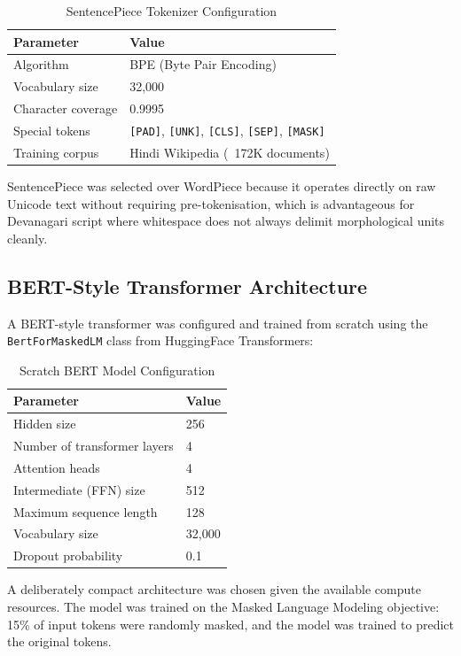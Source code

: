 \documentclass[12pt,a4paper]{report}
\begin{document}
\begin{table}[H]
\centering
\caption{SentencePiece Tokenizer Configuration}
\begin{tabular}{|l|l|}
\hline
\textbf{Parameter} & \textbf{Value} \\
\hline
Algorithm & BPE (Byte Pair Encoding) \\
Vocabulary size & 32,000 \\
Character coverage & 0.9995 \\
Special tokens & \texttt{[PAD]}, \texttt{[UNK]}, \texttt{[CLS]}, \texttt{[SEP]}, \texttt{[MASK]} \\
Training corpus & Hindi Wikipedia (~172K documents) \\
\hline
\end{tabular}
\end{table}

SentencePiece was selected over WordPiece because it operates directly on raw Unicode text without requiring pre-tokenisation, which is advantageous for Devanagari script where whitespace does not always delimit morphological units cleanly.

\subsection{BERT-Style Transformer Architecture}

A BERT-style transformer was configured and trained from scratch using the \texttt{BertForMaskedLM} class from HuggingFace Transformers:

\begin{table}[H]
\centering
\caption{Scratch BERT Model Configuration}
\begin{tabular}{|l|l|}
\hline
\textbf{Parameter} & \textbf{Value} \\
\hline
Hidden size & 256 \\
Number of transformer layers & 4 \\
Attention heads & 4 \\
Intermediate (FFN) size & 512 \\
Maximum sequence length & 128 \\
Vocabulary size & 32,000 \\
Dropout probability & 0.1 \\
\hline
\end{tabular}
\end{table}

\noindent A deliberately compact architecture was chosen given the available compute resources. The model was trained on the Masked Language Modeling objective: 15\% of input tokens were randomly masked, and the model was trained to predict the original tokens.
\end{document}
